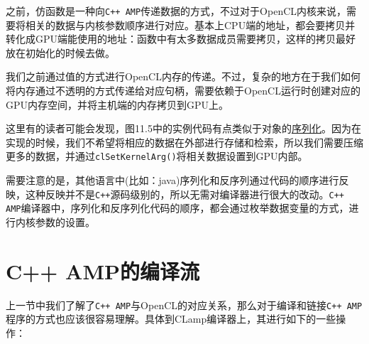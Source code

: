 之前，仿函数是一种向\texttt{C++ AMP}传递数据的方式，不过对于OpenCL内核来说，需要将相关的数据与内核参数顺序进行对应。基本上CPU端的地址，都会要拷贝并转化成GPU端能使用的地址：函数中有太多数据成员需要拷贝，这样的拷贝最好放在初始化的时候去做。

我们之前通过值的方式进行OpenCL内存的传递。不过，复杂的地方在于我们如何将内存通过不透明的方式传递给对应句柄，需要依赖于OpenCL运行时创建对应的GPU内存空间，并将主机端的内存拷贝到GPU上。

这里有的读者可能会发现，图11.5中的实例代码有点类似于对象的\href{http://en.wikipedia.org/wiki/Serialization}{序列化}。因为在实现的时候，我们不希望将相应的数据在外部进行存储和检索，所以我们需要压缩更多的数据，并通过\texttt{clSetKernelArg()}将相关数据设置到GPU内部。

需要注意的是，其他语言中(比如：java)序列化和反序列通过代码的顺序进行反映，这种反映并不是\texttt{C++}源码级别的，所以无需对编译器进行很大的改动。\texttt{C++ AMP}编译器中，序列化和反序列化代码的顺序，都会通过枚举数据变量的方式，进行内核参数的设置。



\section{C++ AMP的编译流}

上一节中我们了解了\texttt{C++ AMP}与OpenCL的对应关系，那么对于编译和链接\texttt{C++ AMP}程序的方式也应该很容易理解。具体到CLamp编译器上，其进行如下的一些操作：

